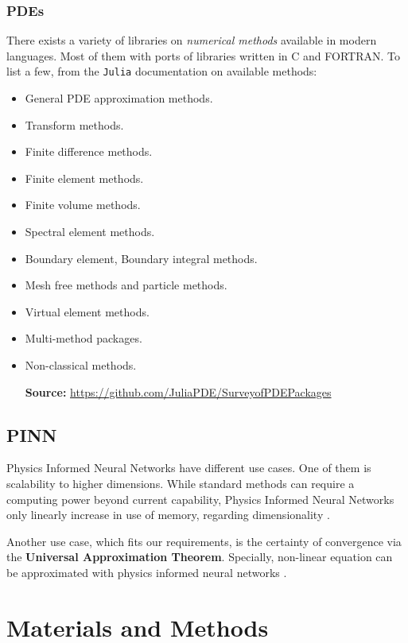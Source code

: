 \documentclass[11pt]{article}
\begin{document}
\subsubsection{PDEs}
\label{sec:orgeeceec9}
There exists a variety of libraries on \emph{numerical methods}
available in modern languages. Most of them with ports of libraries
written in C and FORTRAN. To list a few, from the \texttt{Julia}
documentation on available methods:

\begin{itemize}
\item General PDE approximation methods.
\item Transform methods.
\item Finite difference methods.
\item Finite element methods.
\item Finite volume methods.
\item Spectral element methods.
\item Boundary element, Boundary integral methods.
\item Mesh free methods and particle methods.
\item Virtual element methods.
\item Multi-method packages.
\item Non-classical methods.

\textbf{Source:} \url{https://github.com/JuliaPDE/SurveyofPDEPackages}
\end{itemize}
\subsection{PINN}
\label{sec:org543aee8}
\label{sec:bib-PINN}

Physics Informed Neural Networks have different use cases. One of them is
scalability to higher dimensions. While standard methods can require a computing
power beyond current capability, Physics Informed Neural Networks only linearly
increase in use of memory, regarding dimensionality \cite{zubov2021neuralpde}.

Another use case, which fits our requirements, is the certainty of convergence
via the \textbf{Universal Approximation Theorem}. Specially, non-linear equation can be
approximated with physics informed neural networks \cite{raissi2019physics}.

\section{Materials and Methods}
\label{sec:orgf00143e}
\end{document}
